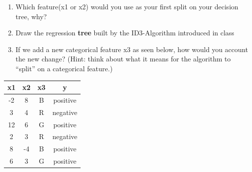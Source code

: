 \documentclass[11pt]{article}
\begin{document}
	\begin{enumerate}
	\item[(a)] Which feature(x1 or x2) would you use as your first split on your decision tree, why?
	\item[(b)] Draw the regression \textbf{tree} built by the ID3-Algorithm introduced in class
    \item[(c)] If we add a new categorical feature x3 as seen below, how would you account the new change? (Hint: think about what it means for the algorithm to ``split'' on a categorical feature.)

    \end{enumerate}
	\begin{center}
	\begin{tabular}{ |c|c|c|c| } 
    \hline
    x1 & x2 & x3 & y \\
    \hline
    -2 & 8 & B& positive \\ 
    3 & 4 & R& negative \\ 
    12 & 6 & G& positive \\ 
    2 & 3 & R& negative \\ 
    8 & -4 & B& positive \\ 
    6 & 3 & G& positive \\ 
    \hline
    \end{tabular}
    \end{center}
\end{document}
